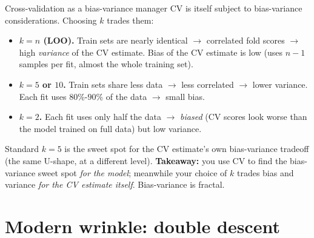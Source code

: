 \documentclass[aspectratio=169]{beamer}
\begin{document}
\begin{frame}{Cross-validation as a bias-variance manager}
  CV is itself subject to bias-variance considerations. Choosing $k$ trades them:
  \vfill
  \begin{itemize}\small
    \item \textbf{$k = n$ (LOO).} Train sets are nearly identical $\to$ correlated fold scores $\to$ high \emph{variance} of the CV estimate. Bias of the CV estimate is low (uses $n-1$ samples per fit, almost the whole training set).
    \item \textbf{$k = 5$ or $10$.} Train sets share less data $\to$ less correlated $\to$ lower variance. Each fit uses $80\%$-$90\%$ of the data $\to$ small bias.
    \item \textbf{$k = 2$.} Each fit uses only half the data $\to$ \emph{biased} (CV scores look worse than the model trained on full data) but low variance.
  \end{itemize}
  \vfill
  Standard $k = 5$ is the sweet spot for the CV estimate's own bias-variance tradeoff (the same U-shape, at a different level).
  \vfill
  \textbf{Takeaway:} you use CV to find the bias-variance sweet spot \emph{for the model}; meanwhile your choice of $k$ trades bias and variance \emph{for the CV estimate itself}. Bias-variance is fractal.
\end{frame}

\section{Modern wrinkle: double descent}
\end{document}
